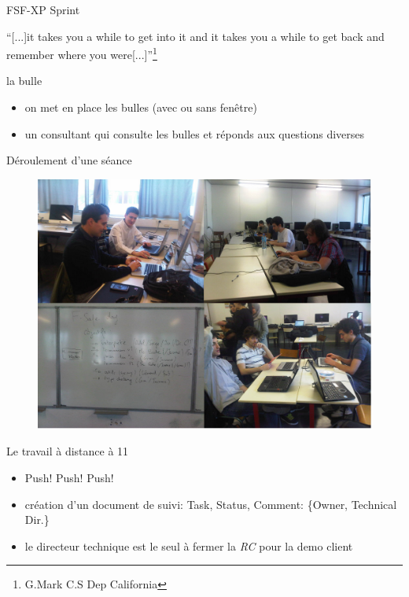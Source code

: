 \begin{frame}{FSF-XP Sprint}
  \begin{block}{}
    ``[...]it takes you a while to get into it and it takes 
    you a while to get back and remember where you were[...]''\footnote{G.Mark C.S Dep California}
  \end{block}
  \begin{block}{la bulle}
    \begin{itemize}
    \item on met en place les bulles (avec ou sans fenêtre)
    \item un consultant qui consulte les bulles et réponds aux questions diverses
    \end{itemize}
  \end{block}
\end{frame}


\begin{frame}{Déroulement d'une séance}
  \begin{figure}
    \includegraphics[scale=0.27]{img/FSafeDay.png}
  \end{figure} 
\end{frame}

\begin{frame}{Le travail à distance à 11}
  \begin{block}{}
    \begin{itemize}
      \item Push! Push! Push!
      \item création d'un document de suivi: Task, Status, Comment: \{Owner, Technical Dir.\}
      \item le directeur technique est le seul à fermer la \emph{RC} pour la demo client
    \end{itemize}
  \end{block}
\end{frame}


